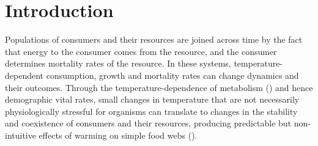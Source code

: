 \documentclass[11pt]{article}
\begin{document}
\newpage{}

\section*{Introduction}




%
%


Populations of consumers and their resources are joined across time by the fact that energy to the consumer comes from the resource, and the consumer determines mortality rates of the resource. 
In these systems, temperature-dependent consumption, growth and mortality rates can change dynamics and their outcomes. 
Through the temperature-dependence of metabolism (\cite{West1997,Gillooly2001}) and hence demographic vital rates, small changes in temperature that are not necessarily physiologically stressful for organisms can translate to changes in the stability and coexistence of consumers and their resources, producing predictable but non-intuitive effects of warming on simple food webs (\cite{Gilbert2014,Vasseur2005,OConnor2011,Rall2010}). 
\end{document}
